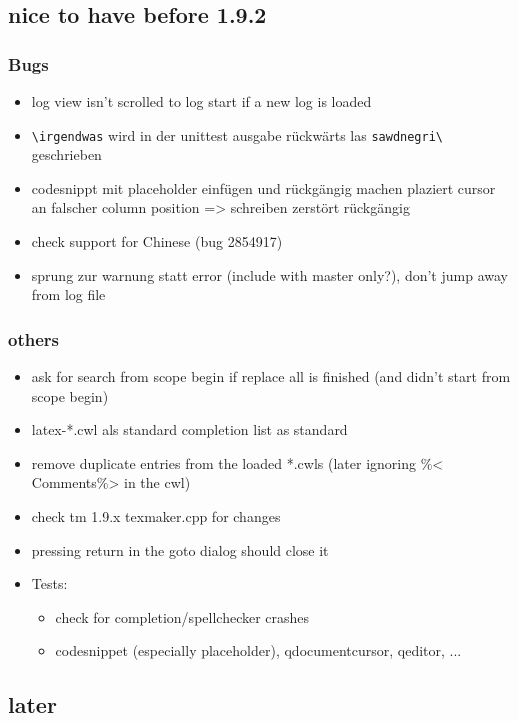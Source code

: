 \documentclass[10pt,a4paper,landscape]{report}
\begin{document}
\subsection{nice to have before 1.9.2 }
\subsubsection{Bugs}
\begin{itemize}
	\item log view isn't scrolled to log start if a new log is loaded
\item \verb+\irgendwas+ wird in der unittest ausgabe rückwärts las \verb+sawdnegri\+ geschrieben
	\item codesnippt mit placeholder einfügen und rückgängig machen plaziert cursor an falscher column position => schreiben zerstört rückgängig
	\item check support for Chinese (bug 2854917)
	\item sprung zur warnung statt error (include with master only?), don't jump away from log file
\end{itemize}

\subsubsection{others}
\begin{itemize}
	\item ask for search from scope begin if replace all is finished (and didn't start from scope begin)
	\item latex-*.cwl als standard completion list as standard
	\item remove duplicate entries from the loaded *.cwls (later ignoring \%< Comments\%> in the cwl)
	\item check tm 1.9.x texmaker.cpp for changes
	\item pressing return in the goto dialog should close it
	\item Tests: \begin{itemize}
		\item check for completion/spellchecker crashes
		\item codesnippet (especially placeholder), qdocumentcursor, qeditor, ...
	\end{itemize}	
\end{itemize}


\subsection{later}
\end{document}
